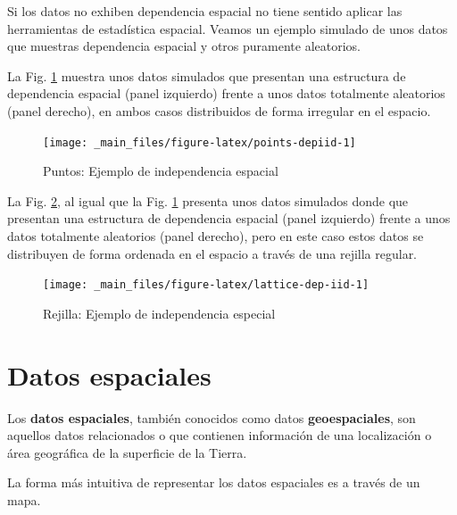 \documentclass[
]{report}
\begin{document}
Si los datos no exhiben dependencia espacial no tiene sentido aplicar las
herramientas de estadística espacial. Veamos un ejemplo simulado de unos datos
que muestras dependencia espacial y otros puramente aleatorios.

La Fig. \ref{fig:points-depiid} muestra unos datos simulados que presentan una
estructura de dependencia espacial (panel izquierdo) frente a unos datos
totalmente aleatorios (panel derecho), en ambos casos distribuidos de forma
irregular en el espacio.

\begin{figure}

{\centering \texttt{[image: \_main\_files/figure-latex/points-depiid-1]} 

}

\caption{Puntos: Ejemplo de independencia espacial}\label{fig:points-depiid}
\end{figure}

La Fig. \ref{fig:lattice-dep-iid}, al igual que la Fig.
\ref{fig:points-depiid} presenta unos datos simulados donde que presentan una
estructura de dependencia espacial (panel izquierdo) frente a unos datos
totalmente aleatorios (panel derecho), pero en este caso estos datos se
distribuyen de forma ordenada en el espacio a través de una rejilla regular.

\begin{figure}

{\centering \texttt{[image: \_main\_files/figure-latex/lattice-dep-iid-1]} 

}

\caption{Rejilla: Ejemplo de independencia especial}\label{fig:lattice-dep-iid}
\end{figure}

\hypertarget{datos-espaciales}{%
\section{Datos espaciales}\label{datos-espaciales}}

Los \textbf{datos espaciales}, también conocidos como datos \textbf{geoespaciales}, son
aquellos datos relacionados o que contienen información de una localización o
área geográfica de la superficie de la Tierra.

La forma más intuitiva de representar los datos espaciales es a través de un
mapa.
\end{document}
